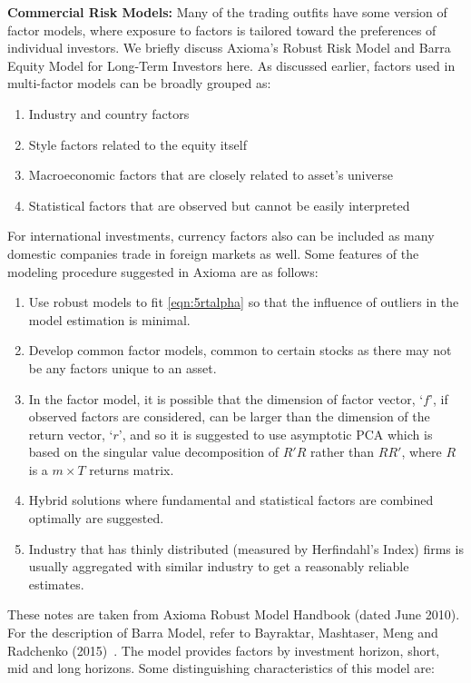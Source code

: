\noindent\textbf{Commercial Risk Models:} Many of the trading outfits have some version of factor models, where exposure to factors is tailored toward the preferences of individual investors. We briefly discuss Axioma's Robust Risk Model and Barra Equity Model for Long-Term Investors here. As discussed earlier, factors used in multi-factor models can be broadly grouped as:


\begin{enumerate}[--]
\item Industry and country factors
\item Style factors related to the equity itself
\item Macroeconomic factors that are closely related to asset's universe
\item Statistical factors that are observed but cannot be easily interpreted
\end{enumerate}


For international investments, currency factors also can be included as many domestic companies trade in foreign markets as well. Some features of the modeling procedure suggested in Axioma are as follows:


\begin{enumerate}[--]
\item Use robust models to fit \eqref{eqn:5rtalpha} so that the influence of outliers in the model estimation is minimal.
\item Develop common factor models, common to certain stocks as there may not be any factors unique to an asset.
\item In the factor model, it is possible that the dimension of factor vector, `$f$', if observed factors are considered, can be larger than the dimension of the return vector, `$r$', and so it is suggested to use asymptotic PCA which is based on the singular value decomposition of $R'R$ rather than $RR'$, where $R$ is a $m \times T$ returns matrix.
\item Hybrid solutions where fundamental and statistical factors are combined optimally are suggested. 
\item Industry that has thinly distributed (measured by Herfindahl's Index) firms is usually aggregated with similar industry to get a reasonably reliable estimates.
\end{enumerate}


These notes are taken from Axioma Robust Model Handbook (dated June 2010). For the description of Barra Model, refer to Bayraktar, Mashtaser, Meng and Radchenko (2015)~\cite{baymasmenrad15}. The model provides factors by investment horizon, short, mid and long horizons. Some distinguishing characteristics of this model are:



